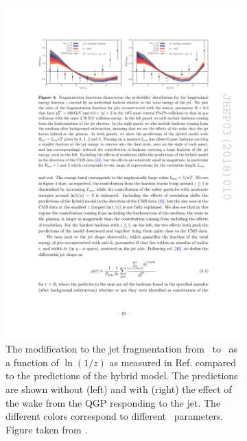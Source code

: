 \begin{figure}
\begin{subfigure}{1\textwidth}
  \centering
\includegraphics[width=1\textwidth]{figures/jetMeasurements/HM_FF}
\caption{The modification to the jet fragmentation from \pp\ to \pbpb\ as a function of $\ln(1/z)$ as measured in Ref.
\cite{Chatrchyan:2014ava} compared to the predictions of the hybrid model.
The predictions are shown without (left) and with (right) the effect of the wake from the QGP responding to the jet.
The different colors correspond to different \Lres\ parameters.
Figure taken from \cite{Hulcher:2017cpt}.}
\label{fig:hm_ff}
\end{subfigure} \\ \\ \\
\begin{subfigure}{1\textwidth}
  \centering

\end{subfigure}
\end{figure}
